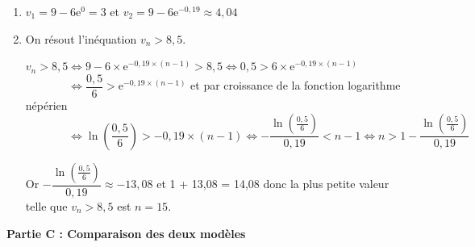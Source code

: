 \documentclass[10pt]{article}
\providecommand{\e}{{\mathrm{e}}}
\begin{document}
\medskip

\begin{enumerate}
\item 
$v_1=9-6\e^{0}=3$ et $v_2=9-6\e^{-0,19}\approx 4,04$

\item On résout l'inéquation $v_n > 8,5$.

$v_n > 8,5
\iff
9 - 6 \times \e^{-0,19\times(n - 1)} > 8,5
\iff 
0,5 > 6 \times \e^{-0,19\times(n - 1)}
$\\

$\phantom{v_n > 8,5}\iff\dfrac{0,5}{6} > \e^{-0,19\times(n - 1)}$ et par croissance de la fonction logarithme népérien\\
$\phantom{v_n > 8,5}
\iff
\ln \left (\dfrac{0,5}{6}\right ) > -0,19\times (n-1)
\iff
-\dfrac{\ln \left (\frac{0,5}{6}\right )}{0,19} < n - 1 \iff n > 1 -\dfrac{\ln \left (\frac{0,5}{6}\right )}{0,19}$

Or $-\dfrac{\ln \left (\frac{0,5}{6}\right )}{0,19}\approx -13,08$ et 1 + 13,08 = 14,08 donc la plus petite valeur telle que $v_n > 8,5$ est $n = 15$.

\end{enumerate}

\bigskip

\textbf{Partie C : Comparaison des deux modèles}

\medskip
\end{document}
